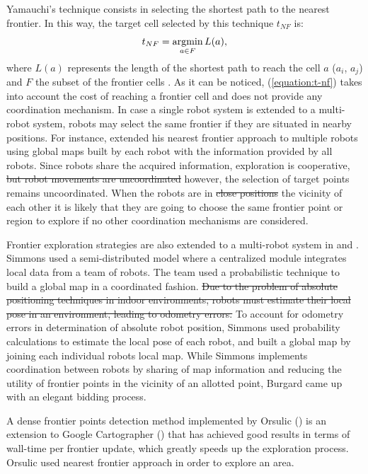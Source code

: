 Yamauchi's technique consists in selecting the shortest path to the nearest frontier. In this way, the target cell selected by this technique $t_{NF}$ is:
\begin{equation}
t_{NF} = \operatorname*{argmin}_{a \in F} L(a), 
\label{equation:t-nf}
\end{equation}
where $L(a)$ represents the length of the shortest path to reach the cell $a$ ($a_{i}$, $a_{j}$) and $F$ the subset of the frontier cells \cite{Julia2012}. As it can be noticed, (\ref{equation:t-nf}) takes into account the cost of reaching a frontier cell and does not provide any coordination mechanism. In case a single robot system is extended to a multi-robot system, robots may select the same frontier if they are situated in nearby positions. For instance, \cite{Yamauchi1998} extended his nearest frontier approach to multiple robots using global maps built by each robot with the information provided by all robots. Since robots share the acquired information, exploration is cooperative, \st{but robot movements are uncoordinated} {\color{red}however, the selection of target points remains uncoordinated}. When the robots are in \st{close positions} {\color{red}the vicinity of each other} it is likely that they {\color{red}are going to} choose the same frontier {\color{red}point or region} to explore if no other coordination mechanisms are considered.

Frontier exploration strategies are also extended to a multi-robot system in \cite{Simmons2000} and \cite{Burgard2005}. Simmons \cite{Simmons2000} used a semi-distributed model where a centralized module integrates local data from a team of robots. The team used a probabilistic technique to build a global map in a coordinated fashion. \st{Due to the problem of absolute positioning techniques in indoor environments, robots must estimate their local pose in an environment, leading to odometry errors.} {\color{red}To account for odometry errors in determination of absolute robot position}, Simmons used probability calculations to estimate the local pose of each robot, and built a global map by joining each individual robots local map. 
While Simmons \cite{Simmons2000} implements coordination between robots by sharing of map information and reducing the utility of frontier points in the vicinity of an allotted point, Burgard \cite{Burgard2005} came up with an elegant bidding process. 

A dense frontier points detection method implemented by Orsulic (\cite{Orsulic2019}) is an extension to Google Cartographer (\cite{Hess2016}) that has achieved good results in terms of wall-time per frontier update, which greatly speeds up {\color{red}the} exploration process. Orsulic used nearest frontier approach in order to explore an area. 

